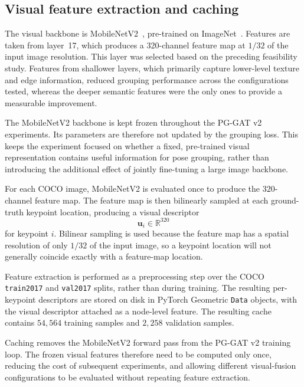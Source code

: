 \subsection{Visual feature extraction and caching}
\label{sec_meth_v2_features}

The visual backbone is MobileNetV2~\cite{sandler2018mobilenetv2},
pre-trained on ImageNet~\cite{deng2009imagenet}.
Features are taken from layer~17,
which produces a 320-channel feature map at $1/32$ of the
input image resolution.
This layer was selected based on the preceding feasibility study.
Features from shallower layers,
which primarily capture lower-level texture and edge information,
reduced grouping performance across the configurations tested,
whereas the deeper semantic features were the only ones
to provide a measurable improvement.

The MobileNetV2 backbone is kept frozen throughout the PG-GAT v2
experiments.
Its parameters are therefore not updated by the grouping loss.
This keeps the experiment focused on whether a fixed,
pre-trained visual representation contains useful information for pose
grouping,
rather than introducing the additional effect of jointly
fine-tuning a large image backbone.

For each COCO image,
MobileNetV2 is evaluated once to produce the
$320$-channel feature map.
The feature map is then bilinearly sampled
at each ground-truth keypoint location,
producing a visual descriptor
\begin{equation}
    \mathbf{u}_i \in \mathbb{R}^{320}
\end{equation}
for keypoint $i$.
Bilinear sampling is used because the feature map has
a spatial resolution of only $1/32$ of the input image,
so a keypoint location will not generally coincide exactly
with a feature-map location.

Feature extraction is performed as a preprocessing step
over the COCO \texttt{train2017} and \texttt{val2017} splits,
rather than during training.
The resulting per-keypoint descriptors are stored on disk in
PyTorch Geometric \texttt{Data} objects,
with the visual descriptor attached as a node-level feature.
The resulting cache contains $54{,}564$ training samples
and $2{,}258$ validation samples.

Caching removes the MobileNetV2 forward pass
from the PG-GAT v2 training loop.
The frozen visual features therefore need to be computed
only once,
reducing the cost of subsequent experiments,
and allowing different visual-fusion configurations to be evaluated
without repeating feature extraction.

